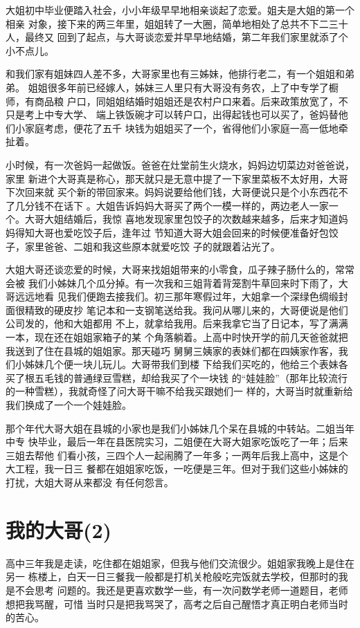 \documentclass[12pt]{book}
\begin{document}
大姐初中毕业便踏入社会，小小年级早早地相亲谈起了恋爱。姐夫是大姐的第一个相亲
对象，接下来的两三年里，姐姐转了一大圈，简单地相处了总共不下二三十人，最终又
回到了起点，与大哥谈恋爱并早早地结婚，第二年我们家里就添了个小不点儿。

和我们家有姐妹四人差不多，大哥家里也有三姊妹，他排行老二，有一个姐姐和弟弟。
姐姐很多年前已经嫁人，姊妹三人里只有大哥没有务农，上了中专学了橱师，有商品粮
户口，同姐姐结婚时姐姐还是农村户口来着。后来政策放宽了，不只是考上中专大学、
端上铁饭碗才可以转户口，出得起钱也可以买了，爸妈替他们小家庭考虑，便花了五千
块钱为姐姐买了一个，省得他们小家庭一高一低地牵扯着。

小时候，有一次爸妈一起做饭。爸爸在灶堂前生火烧水，妈妈边切菜边对爸爸说，家里
新进个大哥真是称心，那天就只是无意中提了一下家里菜板不太好用，大哥下次回来就
买个新的带回家来。妈妈说要给他们钱，大哥便说只是个小东西花不了几分钱不在话下
。大姐告诉妈妈大哥买了两个一模一样的，两边老人一家一个。大哥大姐结婚后，我惊
喜地发现家里包饺子的次数越来越多，后来才知道妈妈得知大哥也爱吃饺子后，逢年过
节知道大哥大姐会回来的时候便准备好包饺子，家里爸爸、二姐和我这些原本就爱吃饺
子的就跟着沾光了。

大姐大哥还谈恋爱的时候，大哥来找姐姐带来的小零食，瓜子辣子肠什么的，常常会被
我们小姊妹几个瓜分掉。有一次我和三姐背着背笼割牛草回来时下雨了，大哥远远地看
见我们便跑去接我们。初三那年寒假过年，大姐拿一个深绿色绸缎封面很精致的硬皮抄
笔记本和一支钢笔送给我。我问从哪儿来的，大哥便说是他们公司发的，他和大姐都用
不上，就拿给我用。后来我拿它当了日记本，写了满满一本，现在还在姐姐家箱子的某
个角落躺着。上高中时快开学的前几天爸爸就把我送到了住在县城的姐姐家。那天碰巧
舅舅三姨家的表妹们都在四姨家作客，我们小姊妹几个便一块儿玩儿。大哥带我们到楼
下给我们买吃的，他给三个表妹各买了根五毛钱的普通绿豆雪糕，却给我买了个一块钱
的“娃娃脸”（那年比较流行的一种雪糕），我就奇怪了问大哥干嘛不给我买跟她们一
样的，大哥当时就重新给我们换成了一个一个娃娃脸。

那个年代大哥大姐在县城的小家也是我们小姊妹几个呆在县城的中转站。二姐当年中专
快毕业，最后一年在县医院实习，二姐便在大哥大姐家吃饭吃了一年；后来三姐去帮他
们看小孩，三四个人一起闹腾了一年多；一两年后我上高中，这是个大工程，我一日三
餐都在姐姐家吃饭，一吃便是三年。但对于我们这些小姊妹的打扰，大姐大哥从来都没
有任何怨言。
\section{我的大哥(2)}
\label{sec-9-35}

高中三年我是走读，吃住都在姐姐家，但我与他们交流很少。姐姐家我晚上是住在另一
栋楼上，白天一日三餐我一般都是打机关枪般吃完饭就去学校，但那时的我是不会思考
问题的。我还是更喜欢数学一些，有一次问数学老师一道题目，老师想把我骂醒，可惜
当时只是把我骂哭了，高考之后自己醒悟才真正明白老师当时的苦心。
\end{document}
